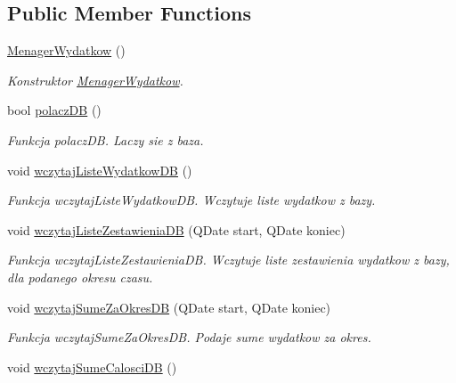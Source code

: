 \subsection*{Public Member Functions}
\begin{DoxyCompactItemize}
\item 
\hypertarget{class_menager_wydatkow_abf10a3d0748daf04ee787e67a642b09a}{}\hyperlink{class_menager_wydatkow_abf10a3d0748daf04ee787e67a642b09a}{Menager\+Wydatkow} ()\label{class_menager_wydatkow_abf10a3d0748daf04ee787e67a642b09a}

\begin{DoxyCompactList}\small\item\em Konstruktor \hyperlink{class_menager_wydatkow}{Menager\+Wydatkow}. \end{DoxyCompactList}\item 
bool \hyperlink{class_menager_wydatkow_af51b71d9b3da677b9b441f778f230a5f}{polacz\+D\+B} ()
\begin{DoxyCompactList}\small\item\em Funkcja polacz\+D\+B. Laczy sie z baza. \end{DoxyCompactList}\item 
\hypertarget{class_menager_wydatkow_a966523a5f411ad1f863ab0e0ca86b97e}{}void \hyperlink{class_menager_wydatkow_a966523a5f411ad1f863ab0e0ca86b97e}{wczytaj\+Liste\+Wydatkow\+D\+B} ()\label{class_menager_wydatkow_a966523a5f411ad1f863ab0e0ca86b97e}

\begin{DoxyCompactList}\small\item\em Funkcja wczytaj\+Liste\+Wydatkow\+D\+B. Wczytuje liste wydatkow z bazy. \end{DoxyCompactList}\item 
void \hyperlink{class_menager_wydatkow_aeaf79dc220332741e81cc073b08d6610}{wczytaj\+Liste\+Zestawienia\+D\+B} (Q\+Date start, Q\+Date koniec)
\begin{DoxyCompactList}\small\item\em Funkcja wczytaj\+Liste\+Zestawienia\+D\+B. Wczytuje liste zestawienia wydatkow z bazy, dla podanego okresu czasu. \end{DoxyCompactList}\item 
void \hyperlink{class_menager_wydatkow_a344d520de55e5134b589ba02300b9431}{wczytaj\+Sume\+Za\+Okres\+D\+B} (Q\+Date start, Q\+Date koniec)
\begin{DoxyCompactList}\small\item\em Funkcja wczytaj\+Sume\+Za\+Okres\+D\+B. Podaje sume wydatkow za okres. \end{DoxyCompactList}\item 
\hypertarget{class_menager_wydatkow_ae9a6ed4e74e93d8873129e8a8de2899f}{}void \hyperlink{class_menager_wydatkow_ae9a6ed4e74e93d8873129e8a8de2899f}{wczytaj\+Sume\+Calosci\+D\+B} ()\label{class_menager_wydatkow_ae9a6ed4e74e93d8873129e8a8de2899f}


\end{DoxyCompactItemize}
